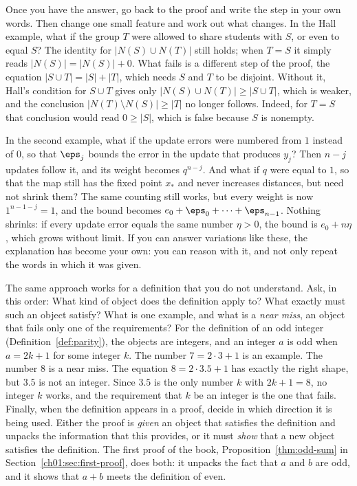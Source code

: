 Once you have the answer, go back to the proof and write the step in your own words. Then change one small feature and work out what changes. In the Hall example, what if the group $T$ were allowed to share students with $S$, or even to equal $S$? The identity for $|N(S)\cup N(T)|$ still holds; when $T=S$ it simply reads $|N(S)|=|N(S)|+0$. What fails is a different step of the proof, the equation $|S\cup T|=|S|+|T|$, which needs $S$ and $T$ to be disjoint. Without it, Hall's condition for $S\cup T$ gives only $|N(S)\cup N(T)|\ge|S\cup T|$, which is weaker, and the conclusion $|N(T)\setminus N(S)|\ge|T|$ no longer follows. Indeed, for $T=S$ that conclusion would read $0\ge|S|$, which is false because $S$ is nonempty.

In the second example, what if the update errors were numbered from $1$ instead of $0$, so that $\eps_j$ bounds the error in the update that produces $y_j$? Then $n-j$ updates follow it, and its weight becomes $q^{n-j}$. And what if $q$ were equal to $1$, so that the map still has the fixed point $x_*$ and never increases distances, but need not shrink them? The same counting still works, but every weight is now $1^{n-1-j}=1$, and the bound becomes $e_0+\eps_0+\cdots+\eps_{n-1}$. Nothing shrinks: if every update error equals the same number $\eta>0$, the bound is $e_0+n\eta$, which grows without limit. If you can answer variations like these, the explanation has become your own: you can reason with it, and not only repeat the words in which it was given.

The same approach works for a definition that you do not understand. Ask, in this order: What kind of object does the definition apply to? What exactly must such an object satisfy? What is one example, and what is a \emph{near miss}, an object that fails only one of the requirements? For the definition of an odd integer (Definition~\ref{def:parity}), the objects are integers, and an integer $a$ is odd when $a=2k+1$ for some integer $k$. The number $7=2\cdot3+1$ is an example. The number $8$ is a near miss. The equation $8=2\cdot3.5+1$ has exactly the right shape, but $3.5$ is not an integer. Since $3.5$ is the only number $k$ with $2k+1=8$, no integer $k$ works, and the requirement that $k$ be an integer is the one that fails. Finally, when the definition appears in a proof, decide in which direction it is being used. Either the proof is \emph{given} an object that satisfies the definition and unpacks the information that this provides, or it must \emph{show} that a new object satisfies the definition. The first proof of the book, Proposition~\ref{thm:odd-sum} in Section~\ref{ch01:sec:first-proof}, does both: it unpacks the fact that $a$ and $b$ are odd, and it shows that $a+b$ meets the definition of even.
